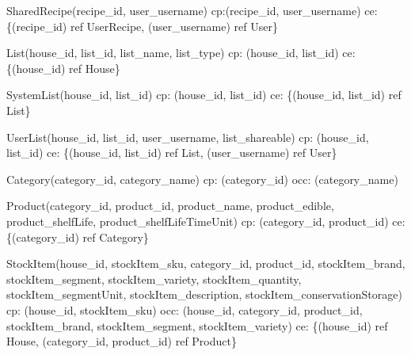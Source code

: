 {\begin{description}
		\item SharedRecipe(recipe\_id, user\_username) \newline
		\acrshort{cp}:(recipe\_id, user\_username) \newline
		\acrshort{ce}: \{(recipe\_id) ref UserRecipe, (user\_username) ref User\}
		
		\item List(house\_id, list\_id, list\_name, list\_type) \newline
		\acrshort{cp}: (house\_id, list\_id) \newline
		\acrshort{ce}: \{(house\_id) ref House\}
		
		\item SystemList(house\_id, list\_id)
		\newline
		\acrshort{cp}: (house\_id, list\_id) \newline
		\acrshort{ce}: \{(house\_id, list\_id) ref List\}
		
		\item UserList(house\_id, list\_id, user\_username, list\_shareable)
		\newline
		\acrshort{cp}: (house\_id, list\_id) \newline
		\acrshort{ce}: \{(house\_id, list\_id) ref List, (user\_username) ref User\}
		
		\item Category(category\_id, category\_name)
		\newline
		\acrshort{cp}: (category\_id) \newline
		\acrshort{occ}: (category\_name)
		
		\item Product(category\_id, product\_id, product\_name, product\_edible, product\_shelfLife, \newline product\_shelfLifeTimeUnit) \newline
		\acrshort{cp}: (category\_id, product\_id) \newline
		\acrshort{ce}: \{(category\_id) ref Category\}
		
		\item StockItem(house\_id, stockItem\_sku, category\_id, product\_id, stockItem\_brand, stockItem\_segment, stockItem\_variety, stockItem\_quantity, stockItem\_segmentUnit, stockItem\_description, stockItem\_conservationStorage) \newline
		\acrshort{cp}: (house\_id, stockItem\_sku) \newline
		\acrshort{occ}: (house\_id, category\_id, product\_id, stockItem\_brand, stockItem\_segment, \newline stockItem\_variety) \newline
		\acrshort{ce}: \{(house\_id) ref House, (category\_id, product\_id) ref Product\}
		

\end{description}}
